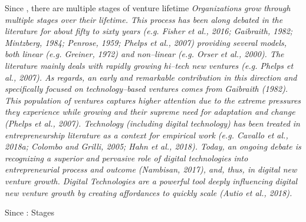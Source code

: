 Since \citet{cavallo2019fostering}, there are multiple stages of venture lifetime \textit{Organizations grow through multiple stages over their lifetime. This process has been along debated in the literature for about fifty to sixty years (e.g. Fisher et al., 2016; Gaibraith, 1982; Mintzberg, 1984; Penrose, 1959; Phelps et al., 2007) providing several models, both linear (e.g. Greiner, 1972) and non–linear (e.g. Orser et al., 2000). The literature mainly deals with rapidly growing hi–tech new ventures (e.g. Phelps et al., 2007). As regards, an early and remarkable contribution in this direction and specifically focused on technology–based ventures comes from Gaibraith (1982). This population of ventures captures higher attention due to the extreme pressures they experience while growing and their supreme need for adaptation and change (Phelps et al., 2007). Technology (including digital technology) has been treated in entrepreneurship literature as a context for empirical work (e.g. Cavallo et al., 2018a; Colombo and Grilli, 2005; Hahn et al., 2018). Today, an ongoing debate is recognizing a superior and pervasive role of digital technologies into entrepreneurial process and outcome (Nambisan, 2017), and, thus, in digital new venture growth. Digital Technologies are a powerful tool deeply influencing digital new venture growth by creating affordances to quickly scale (Autio et al., 2018).}

Since \citet{hanks1994tightening} : Stages

